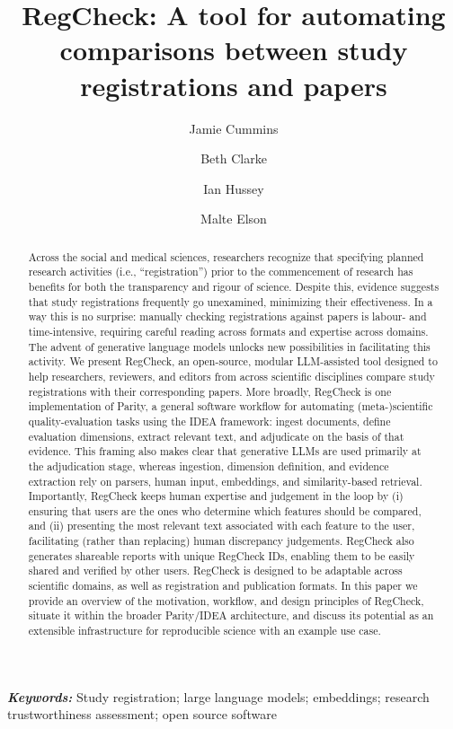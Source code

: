 \documentclass{article}
\title{RegCheck: A tool for automating comparisons between study registrations and papers}
\author[* 1,2]{Jamie Cummins}
\author[1]{Beth Clarke}
\author[1]{Ian Hussey}
\author[1]{Malte Elson}
\affil[1]{\small{Institute of Psychology, University of Bern}}
\affil[2]{\small{Bennett Institute of Applied Data Science, University of Oxford}}
\affil[*]{\small{Corresponding author: jamie.cummins@unibe.ch}}
\providecommand{\keywords}[1]{\textbf{\textit{Keywords:}} #1}
\begin{document}
\maketitle

\begin{abstract}
Across the social and medical sciences, researchers recognize that specifying planned research activities (i.e., ``registration'') prior to the commencement of research has benefits for both the transparency and rigour of science. Despite this, evidence suggests that study registrations frequently go unexamined, minimizing their effectiveness. In a way this is no surprise: manually checking registrations against papers is labour- and time-intensive, requiring careful reading across formats and expertise across domains. The advent of generative language models unlocks new possibilities in facilitating this activity. We present RegCheck, an open-source, modular LLM-assisted tool designed to help researchers, reviewers, and editors from across scientific disciplines compare study registrations with their corresponding papers. More broadly, RegCheck is one implementation of Parity, a general software workflow for automating (meta-)scientific quality-evaluation tasks using the IDEA framework: ingest documents, define evaluation dimensions, extract relevant text, and adjudicate on the basis of that evidence. This framing also makes clear that generative LLMs are used primarily at the adjudication stage, whereas ingestion, dimension definition, and evidence extraction rely on parsers, human input, embeddings, and similarity-based retrieval. Importantly, RegCheck keeps human expertise and judgement in the loop by (i) ensuring that users are the ones who determine which features should be compared, and (ii) presenting the most relevant text associated with each feature to the user, facilitating (rather than replacing) human discrepancy judgements. RegCheck also generates shareable reports with unique RegCheck IDs, enabling them to be easily shared and verified by other users. RegCheck is designed to be adaptable across scientific domains, as well as registration and publication formats. In this paper we provide an overview of the motivation, workflow, and design principles of RegCheck, situate it within the broader Parity/IDEA architecture, and discuss its potential as an extensible infrastructure for reproducible science with an example use case.
\end{abstract}

\keywords{Study registration; large language models; embeddings; research trustworthiness assessment; open source software}
\end{document}
